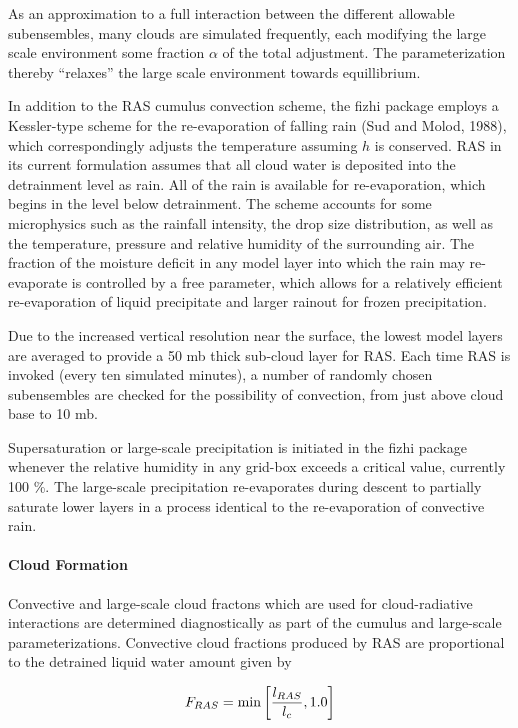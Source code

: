 As an approximation to a full interaction between the different allowable subensembles,
many clouds are simulated frequently, each modifying the large scale environment some fraction
$\alpha$ of the total adjustment. The parameterization thereby ``relaxes'' the large scale environment
towards equillibrium.  

In addition to the RAS cumulus convection scheme, the fizhi package employs a
Kessler-type scheme for the re-evaporation of falling rain (Sud and Molod, 1988), which
correspondingly adjusts the temperature assuming $h$ is conserved. RAS in its current
formulation assumes that all cloud water is deposited into the detrainment level as rain.
All of the rain is available for re-evaporation, which begins in the level below detrainment. 
The scheme accounts for some microphysics such as
the rainfall intensity, the drop size distribution, as well as the temperature, 
pressure and relative humidity of the surrounding air.  The fraction of the moisture deficit 
in any model layer into which the rain may re-evaporate is controlled by a free parameter,
which allows for a relatively efficient re-evaporation of liquid precipitate and larger rainout
for frozen precipitation.

Due to the increased vertical resolution near the surface, the lowest model 
layers are averaged to provide a 50 mb thick sub-cloud layer for RAS.  Each time RAS is
invoked (every ten simulated minutes), 
a number of randomly chosen subensembles are checked for the possibility 
of convection, from just above cloud base to 10 mb.  

Supersaturation or large-scale precipitation is initiated in the fizhi package whenever 
the relative humidity in any grid-box exceeds a critical value, currently 100 \%.
The large-scale precipitation re-evaporates during descent to partially saturate 
lower layers in a process identical to the re-evaporation of convective rain. 

 
\paragraph{Cloud Formation}
\label{sec:fizhi:clouds}

Convective and large-scale cloud fractons which are used for cloud-radiative interactions are determined
diagnostically as part of the cumulus and large-scale parameterizations.
Convective cloud fractions produced by RAS are proportional to the 
detrained liquid water amount given by

\[
F_{RAS} = \min\left[ {l_{RAS}\over l_c}, 1.0 \right]
\]

